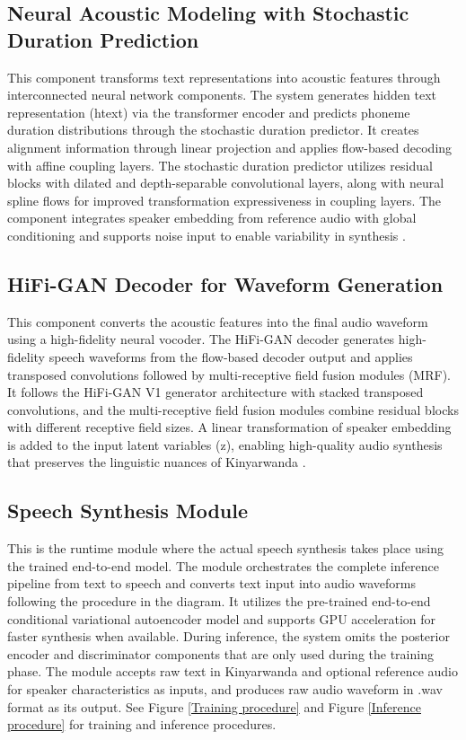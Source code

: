 \documentclass{CSSRforAfrica}
\begin{document}
\subsection {Neural Acoustic Modeling with Stochastic Duration Prediction}

This component transforms text representations into acoustic features through interconnected neural network components. The system generates hidden text representation (htext) via the transformer encoder and predicts phoneme duration distributions through the stochastic duration predictor. It creates alignment information through linear projection and applies flow-based decoding with affine coupling layers. The stochastic duration predictor utilizes residual blocks with dilated and depth-separable convolutional layers, along with neural spline flows for improved transformation expressiveness in coupling layers. The component integrates speaker embedding from reference audio with global conditioning and supports noise input to enable variability in synthesis \cite{kim2021conditional}.


\subsection {HiFi-GAN Decoder for Waveform Generation}

This component converts the acoustic features into the final audio waveform using a high-fidelity neural vocoder. The HiFi-GAN decoder generates high-fidelity speech waveforms from the flow-based decoder output and applies transposed convolutions followed by multi-receptive field fusion modules (MRF). It follows the HiFi-GAN V1 generator architecture with stacked transposed convolutions, and the multi-receptive field fusion modules combine residual blocks with different receptive field sizes. A linear transformation of speaker embedding is added to the input latent variables (z), enabling high-quality audio synthesis that preserves the linguistic nuances of Kinyarwanda \cite{kim2021conditional}.

\subsection {Speech Synthesis Module}

This is the runtime module where the actual speech synthesis takes place using the trained end-to-end model. The module orchestrates the complete inference pipeline from text to speech and converts text input into audio waveforms following the procedure in the diagram. It utilizes the pre-trained end-to-end conditional variational autoencoder model and supports GPU acceleration for faster synthesis when available. During inference, the system omits the posterior encoder and discriminator components that are only used during the training phase. The module accepts raw text in Kinyarwanda and optional reference audio for speaker characteristics as inputs, and produces raw audio waveform in .wav format as its output.
See Figure \ref{Training procedure} and Figure \ref{Inference procedure} for training and inference procedures.
\end{document}
